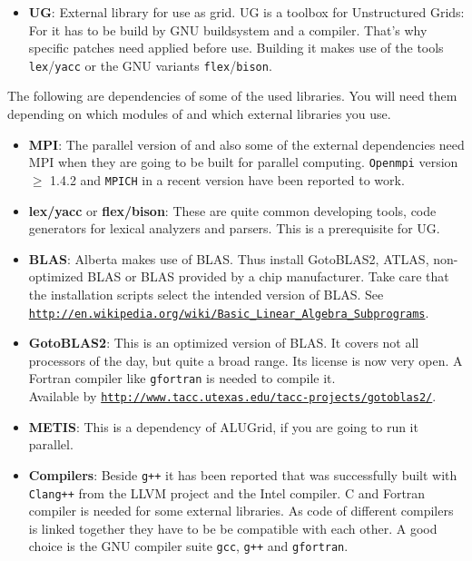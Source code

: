 \begin{itemize}
\item \textbf{UG}: External library for use as grid. UG is a toolbox for Unstructured Grids: For \Dumux it has to be build by GNU buildsystem and a \Cplusplus compiler. That's why \Dune specific patches need applied before use. Building it makes use of the tools \texttt{lex}/\texttt{yacc} or the GNU variants \texttt{flex}/\texttt{bison}. 

\end{itemize}

The following are dependencies of some of the used libraries. You will need them depending on which modules of \Dune and which external libraries you use.

\begin{itemize}
\item \textbf{MPI}: The parallel version of \Dune and also some of the external dependencies need MPI when they are going to be built for parallel computing. \texttt{Openmpi} version $\geqslant$ 1.4.2 and \texttt{MPICH} in a recent version have been reported to work. 

\item \textbf{lex/yacc} or \textbf{flex/bison}: These are quite common developing tools, code generators for lexical analyzers and parsers. This is a prerequisite for UG.

\item \textbf{BLAS}: Alberta makes use of BLAS. Thus install GotoBLAS2, ATLAS, non-optimized BLAS or BLAS provided by a chip manufacturer. Take care that the installation scripts select the intended version of BLAS. See \texttt{\url{http://en.wikipedia.org/wiki/Basic_Linear_Algebra_Subprograms}}.

\item \textbf{GotoBLAS2}: This is an optimized version of BLAS. It covers not  all processors of the day, but quite a broad range. Its license is now very open.  A Fortran compiler like \texttt{gfortran} is needed to compile it.\\
Available by \texttt{\url{http://www.tacc.utexas.edu/tacc-projects/gotoblas2/}}.

\item \textbf{METIS}: This is a dependency of ALUGrid, if you are going to run it parallel.

\item \textbf{Compilers}: Beside \texttt{g++} it has been reported that \Dune was successfully built with \texttt{Clang++} from the LLVM project and the Intel \Cplusplus compiler. 
C and Fortran compiler is needed for some external libraries. As code of different compilers is linked together they have to be be compatible with each other. A good choice is the GNU compiler suite \texttt{gcc}, \texttt{g++} and \texttt{gfortran}.


\end{itemize}
